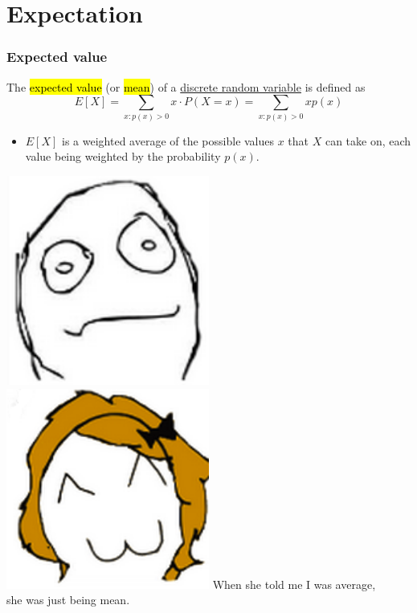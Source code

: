 \documentclass[slidestop,compress,mathserif]{beamer}
\begin{document}



\section{Expectation}
\begin{frame}
\frametitle{Expected value}
\begin{defn}
The \hl{expected value} (or \hl{mean}) of a \underline{discrete random variable} is defined as
\[E[X] = \sum_{x: p(x) > 0} x\cdot P(X = x)= \sum_{x: p(x) > 0} x p(x)\]
\end{defn}

\pause
\begin{itemize}
\item $E[X]$ is a weighted average of the possible values $x$ that $X$ can take on,
each value being weighted by the probability $p(x) $.
\end{itemize}

\pause\vspace{0.5cm}
{
\includegraphics[width = 0.5\textwidth]{figures/joke1}
\includegraphics[width = 0.5\textwidth]{figures/joke2}
}
{
When she told me I was average, \\
she was just being mean.
}


\end{frame}
\end{document}
